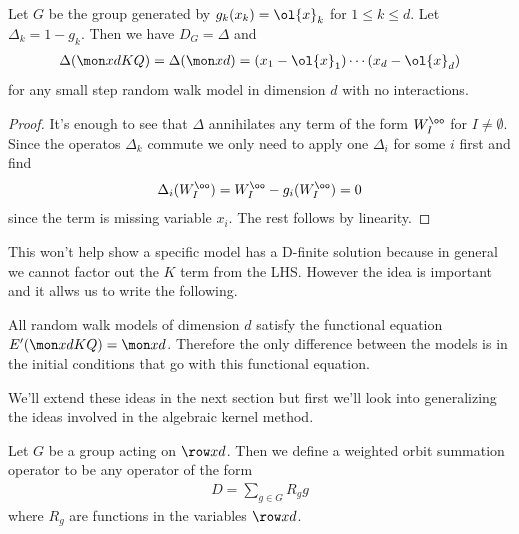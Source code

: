 \begin{theorem} Let $G$ be the group generated by $g_k(x_k) = \ol{x}_k$ for $1 \leq k \leq d$. Let $\Delta_k = 1 - g_k$. Then we have $D_G = \Delta$
and
\begin{align}
	\Delta(\mon xd KQ) = \Delta(\mon xd) = (x_1 - \ol{x}_1)\cdots(x_d-\ol{x}_d)
\end{align}
for any small step random walk model in dimension $d$ with no interactions.
\end{theorem}
\begin{proof} It's enough to see that $\Delta$ annihilates any term of the form $W_I^\oo$ for $I \neq \emptyset$. Since the operatos $\Delta_k$ commute we only need to apply one $\Delta_i$ for some $i$ first and find
\begin{align}
	\Delta_i(W_I^\oo) = W_I^\oo - g_i(W_I^\oo) = 0
\end{align}
since the term is missing variable $x_i$. The rest follows by linearity.
\end{proof}
This won't help show a specific model has a D-finite solution because in general we cannot factor out the $K$ term from the LHS. However the idea is important and it allws us to write the following.
\begin{corollary} All random walk models of dimension $d$ satisfy the functional equation $E'(\mon xd KQ) = \mon xd$. Therefore the only difference between the models is in the initial conditions that go with this functional equation.
\end{corollary}

We'll extend these ideas in the next section but first we'll look into generalizing the ideas involved in the algebraic kernel method.
\begin{definition} Let $G$ be a group acting on $\row xd$. Then we define a weighted orbit summation operator to be any operator of the form
\begin{align}
	D = \sum_{g\in G}R_g g
\end{align}
where $R_g$ are functions in the variables $\row xd$.
\end{definition}

